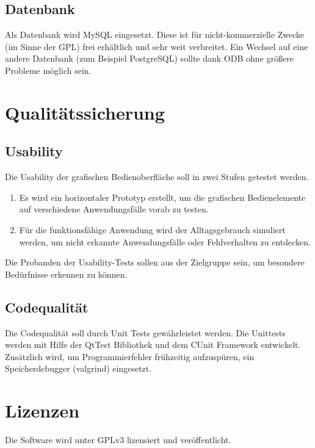 \documentclass[a4paper,10pt]{article}
\begin{document}
\subsection{Datenbank}
Als Datenbank wird MySQL eingesetzt. Diese ist für nicht-kommerzielle Zwecke (im Sinne der GPL) frei erhältlich und sehr weit verbreitet. Ein Wechsel auf eine andere Datenbank (zum Beispiel PostgreSQL) sollte dank ODB ohne größere Probleme möglich sein.

\section{Qualitätssicherung}

\subsection{Usability}
Die Usability der grafischen Bedienoberfläche soll in zwei Stufen getestet werden.
\begin{enumerate}
\item Es wird ein horizontaler Prototyp erstellt,  um die grafischen Bedienelemente auf verschiedene Anwendungsfälle vorab zu testen. 
\item Für die funktionsfähige Anwendung wird der Alltagsgebrauch simuliert werden, um nicht erkannte Anwendungsfälle oder Fehlverhalten zu entdecken.
\end{enumerate}
Die Probanden der Usability-Tests sollen aus der Zielgruppe sein, um besondere Bedürfnisse erkennen zu können.    

\subsection{Codequalität}
Die Codequalität soll durch Unit Tests gewährleistet werden.
Die Unittests werden mit Hilfe der QtTest Bibliothek und dem CUnit Framework entwickelt.
Zusätzlich wird, um Programmierfehler frühzeitig aufzuspüren, ein Speicherdebugger (valgrind) eingesetzt.

\section{Lizenzen}
Die Software wird unter GPLv3 lizensiert und veröffentlicht.
\end{document}
